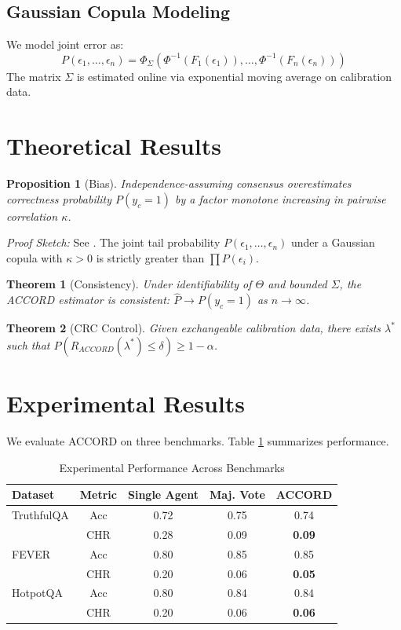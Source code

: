 \documentclass[conference]{IEEEtran}
\newtheorem{proposition}{Proposition}
\newtheorem{theorem}{Theorem}
\begin{document}
\subsection{Gaussian Copula Modeling} \label{sec:copula}
We model joint error as:
\begin{equation} \label{eq:copula}
P(\epsilon_1, \dots, \epsilon_n) = \Phi_\Sigma(\Phi^{-1}(F_1(\epsilon_1)), \dots, \Phi^{-1}(F_n(\epsilon_n)))
\end{equation}
The matrix $\Sigma$ is estimated online via exponential moving average on calibration data.

\section{Theoretical Results}
\begin{proposition}[Bias]
Independence-assuming consensus overestimates correctness probability $P(y_c=1)$ by a factor monotone increasing in pairwise correlation $\kappa$.
\end{proposition}
\textit{Proof Sketch:} See \cite{b4}. The joint tail probability $P(\epsilon_1, \dots, \epsilon_n)$ under a Gaussian copula with $\kappa > 0$ is strictly greater than $\prod P(\epsilon_i)$.

\begin{theorem}[Consistency]
Under identifiability of $\Theta$ and bounded $\Sigma$, the ACCORD estimator is consistent: $\hat{P} \to P(y_c=1)$ as $n \to \infty$.
\end{theorem}

\begin{theorem}[CRC Control]
Given exchangeable calibration data, there exists $\lambda^*$ such that $P(R_{ACCORD}(\lambda^*) \le \delta) \ge 1 - \alpha$.
\end{theorem}

\section{Experimental Results}
We evaluate ACCORD on three benchmarks. Table \ref{tab:results} summarizes performance.

\begin{table}[htbp]
\caption{Experimental Performance Across Benchmarks}
\label{tab:results}
\begin{center}
\begin{tabular}{lcccc}
\toprule
Dataset & Metric & Single Agent & Maj. Vote & \textbf{ACCORD} \\
\midrule
TruthfulQA & Acc & 0.72 & 0.75 & 0.74 \\
 & CHR & 0.28 & 0.09 & \textbf{0.09} \\
\midrule
FEVER & Acc & 0.80 & 0.85 & 0.85 \\
 & CHR & 0.20 & 0.06 & \textbf{0.05} \\
\midrule
HotpotQA & Acc & 0.80 & 0.84 & 0.84 \\
 & CHR & 0.20 & 0.06 & \textbf{0.06} \\
\bottomrule
\end{tabular}
\end{center}
\end{table}
\end{document}
